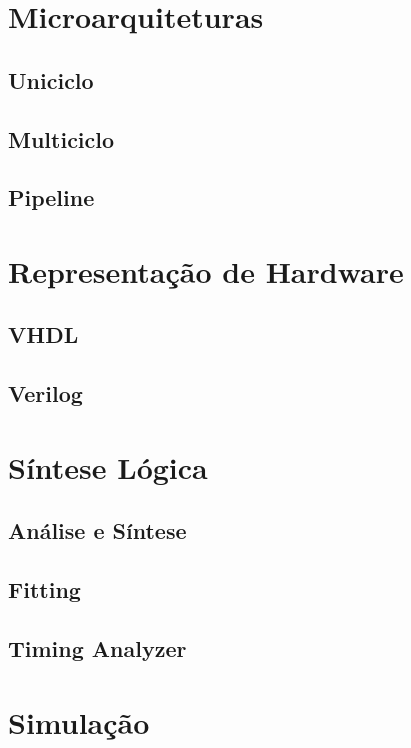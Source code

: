 \section{Microarquiteturas}
{}

    \subsection{Uniciclo}
    {}

    \subsection{Multiciclo}
    {}

    \subsection{Pipeline}
    {}

\section{Representação de Hardware}
{}

    \subsection{VHDL}
    {}

    \subsection{Verilog}
    {}

\section{Síntese Lógica}
{}

    \subsection{Análise e Síntese}
    {}

    \subsection{Fitting}
    {}

    \subsection{Timing Analyzer}
    {}

\section{Simulação}
{}


